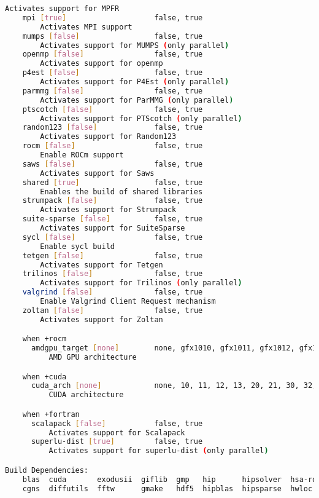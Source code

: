 {\begin{lstlisting}[language=bash]
        Activates support for MPFR
    mpi [true]                    false, true
        Activates MPI support
    mumps [false]                 false, true
        Activates support for MUMPS (only parallel)
    openmp [false]                false, true
        Activates support for openmp
    p4est [false]                 false, true
        Activates support for P4Est (only parallel)
    parmmg [false]                false, true
        Activates support for ParMMG (only parallel)
    ptscotch [false]              false, true
        Activates support for PTScotch (only parallel)
    random123 [false]             false, true
        Activates support for Random123
    rocm [false]                  false, true
        Enable ROCm support
    saws [false]                  false, true
        Activates support for Saws
    shared [true]                 false, true
        Enables the build of shared libraries
    strumpack [false]             false, true
        Activates support for Strumpack
    suite-sparse [false]          false, true
        Activates support for SuiteSparse
    sycl [false]                  false, true
        Enable sycl build
    tetgen [false]                false, true
        Activates support for Tetgen
    trilinos [false]              false, true
        Activates support for Trilinos (only parallel)
    valgrind [false]              false, true
        Enable Valgrind Client Request mechanism
    zoltan [false]                false, true
        Activates support for Zoltan

    when +rocm
      amdgpu_target [none]        none, gfx1010, gfx1011, gfx1012, gfx1013, gfx1030, gfx1031, gfx1032, gfx1033, gfx1034, gfx1035, gfx1036, gfx1100, gfx1101, gfx1102, gfx1103, gfx701, gfx801, gfx802, gfx803, gfx900, gfx900:xnack-, gfx902, gfx904, gfx906, gfx906:xnack-, gfx908, gfx908:xnack-, gfx909, gfx90a, gfx90a:xnack+, gfx90a:xnack-, gfx90c, gfx940, gfx941, gfx942
          AMD GPU architecture

    when +cuda
      cuda_arch [none]            none, 10, 11, 12, 13, 20, 21, 30, 32, 35, 37, 50, 52, 53, 60, 61, 62, 70, 72, 75, 80, 86, 87, 89, 90, 90a
          CUDA architecture

    when +fortran
      scalapack [false]           false, true
          Activates support for Scalapack
      superlu-dist [true]         false, true
          Activates support for superlu-dist (only parallel)

Build Dependencies:
    blas  cuda       exodusii  giflib  gmp   hip      hipsolver  hsa-rocr-dev  hypre  kokkos          lapack  libx11   llvm-amdgpu  metis  mmg   mpfr  mumps     p4est            parmetis  python     rocblas    rocprim  rocsolver  rocthrust  scalapack  sowing     suite-sparse  tetgen    valgrind  zoltan
    cgns  diffutils  fftw      gmake   hdf5  hipblas  hipsparse  hwloc         jpeg   kokkos-kernels  libpng  libyaml  memkind      mkl    moab  mpi   netcdf-c  parallel-netcdf  parmmg    random123  rocm-core  rocrand  rocsparse  saws       scotch     strumpack  superlu-dist  trilinos  zlib-api


\end{lstlisting}}
